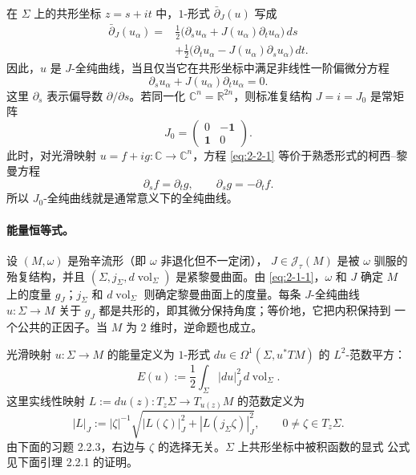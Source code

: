 在 $\Sigma$ 上的共形坐标 $z=s+it$ 中，$1$-形式 $\bar\partial_J(u)$ 写成
\begin{align*}
  \bar\partial_J(u_\alpha)
  ={}&\frac12\bigl(\partial_su_\alpha+J(u_\alpha)\partial_tu_\alpha\bigr)\,ds\\
     &+\frac12\bigl(\partial_tu_\alpha-J(u_\alpha)\partial_su_\alpha\bigr)\,dt.
\end{align*}
因此，$u$ 是 $J$-全纯曲线，当且仅当它在共形坐标中满足非线性一阶偏微分方程
\begin{equation}\label{eq:2-2-1}
  \partial_su_\alpha+J(u_\alpha)\partial_tu_\alpha=0.
\end{equation}
这里 $\partial_s$ 表示偏导数 $\partial/\partial s$。若同一化
$\mathbb C^n=\mathbb R^{2n}$，则标准复结构 $J=i=J_0$ 是常矩阵
\[
  J_0=
  \begin{pmatrix}
    0&-\mathbf1\\
    \mathbf1&0
  \end{pmatrix}.
\]
此时，对光滑映射 $u=f+ig:\mathbb C\to\mathbb C^n$，方程
\eqref{eq:2-2-1} 等价于熟悉形式的柯西--黎曼方程
\[
  \partial_sf=\partial_tg,
  \qquad
  \partial_sg=-\partial_tf.
\]
所以 $J_0$-全纯曲线就是通常意义下的全纯曲线。

\paragraph{能量恒等式。}
设 $(M,\omega)$ 是殆辛流形（即 $\omega$ 非退化但不一定闭），
$J\in\mathcal J_\tau(M)$ 是被 $\omega$ 驯服的殆复结构，并且
$(\Sigma,j_\Sigma,d\operatorname{vol}_\Sigma)$ 是紧黎曼曲面。由
\eqref{eq:2-1-1}，$\omega$ 和 $J$ 确定 $M$ 上的度量 $g_J$；$j_\Sigma$ 和
$d\operatorname{vol}_\Sigma$ 则确定黎曼曲面上的度量。每条 $J$-全纯曲线
$u:\Sigma\to M$ 关于 $g_J$ 都是共形的，即其微分保持角度；等价地，它把内积保持到
一个公共的正因子。当 $M$ 为 $2$ 维时，逆命题也成立。

光滑映射 $u:\Sigma\to M$ 的能量定义为 $1$-形式
$du\in\Omega^1(\Sigma,u^*TM)$ 的 $L^2$-范数平方：
\[
  E(u):=\frac12\int_\Sigma |du|_J^2\,d\operatorname{vol}_\Sigma.
\]
这里实线性映射 $L:=du(z):T_z\Sigma\to T_{u(z)}M$ 的范数定义为
\[
  |L|_J:=|\zeta|^{-1}
  \sqrt{|L(\zeta)|_J^2+|L(j_\Sigma\zeta)|_J^2},
  \qquad 0\ne\zeta\in T_z\Sigma.
\]
由下面的习题 2.2.3，右边与 $\zeta$ 的选择无关。$\Sigma$ 上共形坐标中被积函数的显式
公式见下面引理 2.2.1 的证明。

